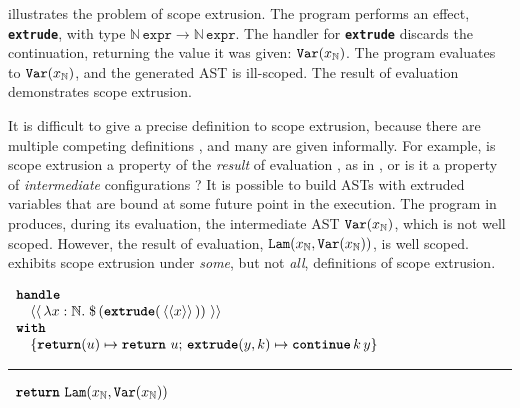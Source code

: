   illustrates the problem of scope extrusion. The program performs an effect, \textbf{\texttt{extrude}}, with type $\mathbb{N} \,  \texttt{expr} \to \mathbb{N} \, \texttt{expr}$. The handler for \textbf{\texttt{extrude}} discards the continuation, returning the value it was given: $\Var{x}{\mathbb{N}}$. The program evaluates to $\Var{x}{\mathbb{N}}$, and the generated AST is ill-scoped. The result of evaluation demonstrates scope extrusion.

It is difficult to give a precise definition to scope extrusion, because there are multiple competing definitions \citep{kiselyov-14,kiselyov-16}, and many are given informally. For example, is scope extrusion a property of the \textit{result} of evaluation \citep{kiselyov-16}, as in , or is it a property of \textit{intermediate} configurations \citep{kiselyov-14}? It is possible to build ASTs with extruded variables that are bound at some future point in the execution. The program in  produces, during its evaluation, the intermediate AST $\Var{x}{\mathbb{N}}$, which is not well scoped. However, the result of evaluation, $\Lam{\Binder{x}{\mathbb{N}}}{\Var{x}{\mathbb{N}}}$, is well scoped.  exhibits scope extrusion under \textit{some}, but not \textit{all}, definitions of scope extrusion.

  \begin{code}
  \begin{efflst}
    $\begin{array}{l}
      \textbf{\texttt{handle}} \\
      \quad \equote[\, {\lambda x:\mathbb{N}.\; \splice[\, {(\textbf{\texttt{extrude}}(\, \equote[x] \, ))}\, ]} \, ] \\
      \textbf{\texttt{with}} \\
      \quad \{ \textbf{\texttt{return}}(u) \mapsto {\return{u}}; \, \textbf{\texttt{extrude}}(y, k) \mapsto {\continue{k}{y}}\}\\
    \end{array}$

    \vspace{2mm} 
\textcolor{effComment}{\hrule height 0.2mm \relax}
\vspace{2mm} 

\textcolor{effComment}{$\begin{array}{l}\return{\Lam{\Binder{x}{\mathbb{N}}}{\Var{x}{\mathbb{N}}}}\end{array}$}

\end{efflst}
%
\label{listing:efflang-maybe-scope-extrusion}
\end{code}


